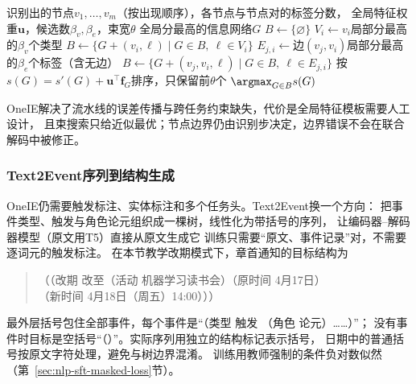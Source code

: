 \begin{algorithm}[OneIE的束搜索联合解码]
  \label{alg:nlp-extraction-oneie-beam}
  \begin{algorithmic}[1]
    \Require 识别出的节点$v_1,\ldots,v_m$（按出现顺序），各节点与节点对的标签分数，
      全局特征权重$\bm{u}$，候选数$\beta_v,\beta_e$，束宽$\theta$
    \Ensure 全局分最高的信息网络$G$
    \State $B\gets\{\varnothing\}$
      \State $V_i\gets v_i$局部分最高的$\beta_v$个类型
      \State $B\gets\{G+(v_i,\ell)\mid G\in B,\ \ell\in V_i\}$
        \State $E_{j,i}\gets$边$(v_j,v_i)$局部分最高的$\beta_e$个标签（含无边）
        \State $B\gets\{G+(v_j,v_i,\ell)\mid G\in B,\ \ell\in E_{j,i}\}$
          \State 按$s(G)=s'(G)+\bm{u}^{\top}\bm{f}_G$排序，只保留前$\theta$个
        \EndIf
      \EndFor
    \EndFor
    \State \Return $\argmax_{G\in B}s(G)$
  \end{algorithmic}
\end{algorithm}

OneIE解决了流水线的误差传播与跨任务约束缺失，代价是全局特征模板需要人工设计，
且束搜索只给近似最优；节点边界仍由识别步决定，边界错误不会在联合解码中被修正。

\subsubsection{Text2Event序列到结构生成}
\label{sec:nlp-extraction-text2event}

OneIE仍需要触发标注、实体标注和多个任务头。Text2Event换一个方向：
把事件类型、触发与角色论元组织成一棵树，线性化为带括号的序列，
让编码器--解码器模型（原文用T5）直接从原文生成它
训练只需要“原文、事件记录”对，不需要逐词元的触发标注。
在本节教学改期模式下，章首通知的目标结构为
\begin{quote}
（（改期 改至（活动 机器学习读书会）（原时间 4月17日）\\
（新时间 4月18日（周五）14:00）））
\end{quote}
最外层括号包住全部事件，每个事件是“（类型 触发 （角色 论元）……）”；
没有事件时目标是空括号“（）”。实际序列用独立的结构标记表示括号，
日期中的普通括号按原文字符处理，避免与树边界混淆。
训练用教师强制的条件负对数似然（第~\ref{sec:nlp-sft-masked-loss}节）。

